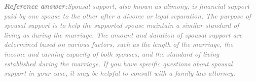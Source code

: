 \documentclass[a4paper,11pt]{article}
\begin{document}
\begin{refanswerenv}
{\footnotesize\textit{\textcolor{gray}{\textbf{Reference answer:}\enspace Spousal support, also known as alimony, is financial support paid by one spouse to the other after a divorce or legal separation. The purpose of spousal support is to help the supported spouse maintain a similar standard of living as during the marriage. The amount and duration of spousal support are determined based on various factors, such as the length of the marriage, the income and earning capacity of both spouses, and the standard of living established during the marriage. If you have specific questions about spousal support in your case, it may be helpful to consult with a family law attorney.}}}
\end{refanswerenv}
\end{document}
